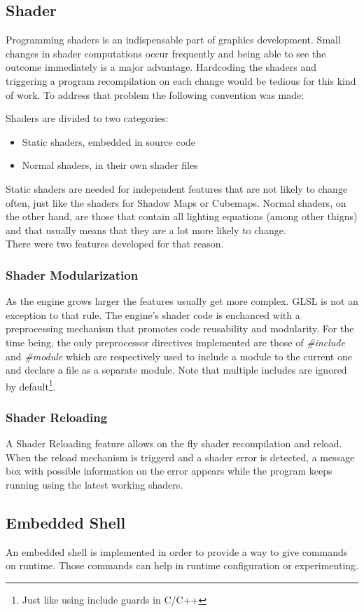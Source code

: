 \subsection{Shader}
Programming shaders is an indispensable part of graphics development. Small changes in shader
computations occur frequently and being able to see the outcome immediately is a major
advantage. Hardcoding the shaders and triggering a program recompilation on each change would
be tedious for this kind of work. To address that problem the following convention was made:

\noindent Shaders are divided to two categories:

\begin{itemize}
\item Static shaders, embedded in source code
\item Normal shaders, in their own shader files
\end{itemize}

\noindent Static shaders are needed for independent features that are not likely to change often,
just like the shaders for Shadow Maps or Cubemaps. Normal shaders, on the other hand, are those
that contain all lighting equations (among other thigns) and that usually means that they are a
lot more likely to change.\\
There were two features developed for that reason.

\subsubsection{Shader Modularization}
As the engine grows larger the features usually get more complex. GLSL is not an exception to that
rule. The engine's shader code is enchanced with a preprocessing mechanism that promotes code reusability
and modularity. For the time being, the only preprocessor directives implemented are those of
\textit{\#include} and \textit{\#module} which are respectively used to include a module to the
current one and declare a file as a separate module. Note that multiple includes are ignored by
default\footnote{Just like using include guards in C/C++}.

\subsubsection{Shader Reloading}
A Shader Reloading feature allows on the fly shader recompilation and reload. When the reload
mechanism is triggerd and a shader error is detected, a message box with possible information on
the error appears while the program keeps running using the latest working shaders.

\subsection{Embedded Shell}
An embedded shell is implemented in order to provide a way to give commands on runtime. Those commands
can help in runtime configuration or experimenting.
